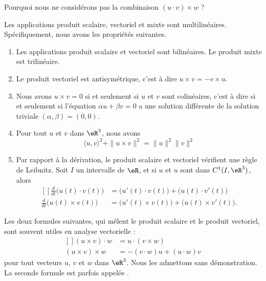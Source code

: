Pourquoi nous ne considérons pas la combinaison $(u\cdot v)\times w$ ?

\begin{proposition}		 \label{PropScalMixtLin}
	Les applications produit scalaire, vectoriel et mixte sont multilinéaires. Spécifiquement, nous avons les propriétés suivantes.
	\begin{enumerate}
		\item
			Les applications produit scalaire et vectoriel sont bilinéaires. Le produit mixte est trilinéaire.
		\item
			Le produit vectoriel est antisymétrique, c'est à dire $u\times v=-v\times u$.
		\item
			Nous avons $u\times v=0$ si et seulement si $u$ et $v$ sont colinéaires, c'est à dire si et seulement si l'équation $\alpha u+\beta v=0$ a une solution différente de la solution triviale $(\alpha,\beta)=(0,0)$.
		\item		\label{ItemPropScalMixtLiniv}
			Pour tout $u$ et $v$ dans $\eR^3$, nous avons
			\begin{equation}
				\langle u, v\rangle^2 +\| u\times v \|^2=\| u \|^2\| v \|^2
			\end{equation}
		\item
			Par rapport à la dérivation, le produit scalaire et vectoriel vérifient une règle de Leibnitz. Soit $I$ un intervalle de $\eR$, et si $u$ et $u$ sont dans $C^1(I,\eR^3)$, alors
			\begin{equation}		\label{EqFormLeibProdscalVect}
				\begin{aligned}[]
					\frac{ d }{ dt }\big( u(t)\cdot v(t) \big)&=\big( u'(t)\cdot v(t) \big)+\big( u(t)\cdot v'(t) \big)\\
					\frac{ d }{ dt }\big( u(t)\times v(t) \big)&=\big( u'(t)\times v(t) \big)+\big( u(t)\times v'(t) \big).
				\end{aligned}
			\end{equation}
		\end{enumerate}
\end{proposition}

Les deux formules suivantes, qui mêlent le produit scalaire et le produit vectoriel, sont souvent utiles en analyse vectorielle :
\begin{equation}
	\begin{aligned}[]
		(u\times v)\cdot w&=u\cdot(v\times w)\\
		(u\times v)\times w&=-(v\cdot w)u+(u\cdot w)v		\label{EqFormExpluxxx}
	\end{aligned}
\end{equation}
pour tout vecteurs $u$, $v$ et $w$ dans $\eR^3$. Nous les admettons sans démonstration. La seconde formule est parfois appelée .




